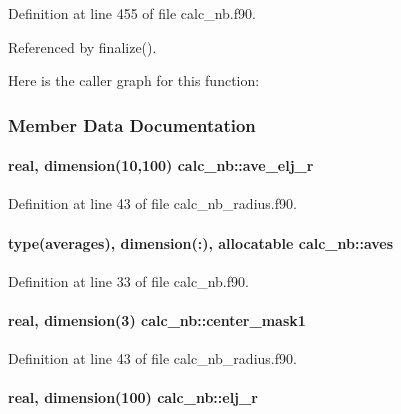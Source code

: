 Definition at line 455 of file calc\-\_\-nb.\-f90.



Referenced by finalize().



Here is the caller graph for this function\-:




\subsubsection{Member Data Documentation}
\hypertarget{classcalc__nb_aebba0b48c6600b0defb99f924c13adcd}{
\paragraph[{ave\-\_\-elj\-\_\-r}]{\setlength{\rightskip}{0pt plus 5cm}real, dimension(10,100) calc\-\_\-nb\-::ave\-\_\-elj\-\_\-r}}\label{classcalc__nb_aebba0b48c6600b0defb99f924c13adcd}


Definition at line 43 of file calc\-\_\-nb\-\_\-radius.\-f90.

\hypertarget{classcalc__nb_a7c88dc0e90934920f9ea37a05ba4c394}{
\paragraph[{aves}]{\setlength{\rightskip}{0pt plus 5cm}type({\bf averages}), dimension(\-:), allocatable calc\-\_\-nb\-::aves}}\label{classcalc__nb_a7c88dc0e90934920f9ea37a05ba4c394}


Definition at line 33 of file calc\-\_\-nb.\-f90.

\hypertarget{classcalc__nb_abe9b066386968d07626e3187008e5b95}{
\paragraph[{center\-\_\-mask1}]{\setlength{\rightskip}{0pt plus 5cm}real, dimension(3) calc\-\_\-nb\-::center\-\_\-mask1}}\label{classcalc__nb_abe9b066386968d07626e3187008e5b95}


Definition at line 43 of file calc\-\_\-nb\-\_\-radius.\-f90.

\hypertarget{classcalc__nb_a7b2f5b555609710957cf5a10976a4033}{
\paragraph[{elj\-\_\-r}]{\setlength{\rightskip}{0pt plus 5cm}real, dimension(100) calc\-\_\-nb\-::elj\-\_\-r}}\label{classcalc__nb_a7b2f5b555609710957cf5a10976a4033}


